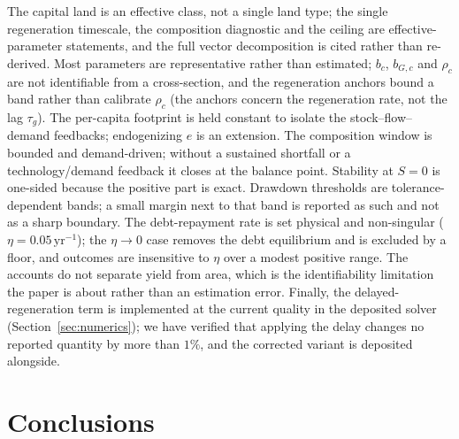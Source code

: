 The capital land is an effective class, not a single land type; the single regeneration timescale, the composition diagnostic and the ceiling are effective-parameter statements, and the full vector decomposition is cited rather than re-derived. Most parameters are representative rather than estimated; $b_c$, $b_{G,c}$ and $\rho_c$ are not identifiable from a cross-section, and the regeneration anchors bound a band rather than calibrate $\rho_c$ (the anchors concern the regeneration rate, not the lag $\tau_g$). The per-capita footprint is held constant to isolate the stock--flow--demand feedbacks; endogenizing $e$ is an extension. The composition window is bounded and demand-driven; without a sustained shortfall or a technology/demand feedback it closes at the balance point. Stability at $S=0$ is one-sided because the positive part is exact. Drawdown thresholds are tolerance-dependent bands; a small margin next to that band is reported as such and not as a sharp boundary. The debt-repayment rate is set physical and non-singular ($\eta=0.05\,\mathrm{yr}^{-1}$); the $\eta\to0$ case removes the debt equilibrium and is excluded by a floor, and outcomes are insensitive to $\eta$ over a modest positive range. The accounts do not separate yield from area, which is the identifiability limitation the paper is about rather than an estimation error. Finally, the delayed-regeneration term is implemented at the current quality in the deposited solver (Section~\ref{sec:numerics}); we have verified that applying the delay changes no reported quantity by more than $1\%$, and the corrected variant is deposited alongside.

\section{Conclusions}\label{sec:conclusions}

